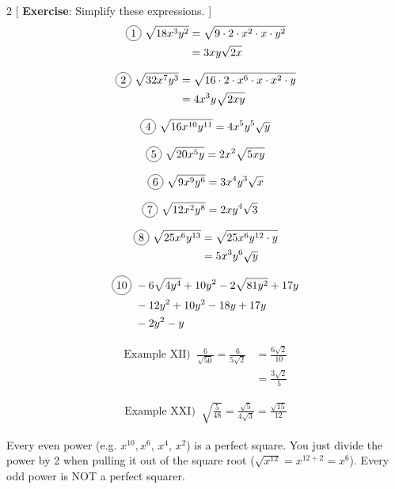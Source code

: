 \begin{multicols}{2}
[
  \textbf{Exercise}: Simplify these expressions.
]
\begin{align*}
  \circled{1}\ \sqrt{18x^{3}y^{2}}&= \sqrt{9 \cdot 2 \cdot x^{2} \cdot x \cdot y^{2}} \\
  &=3xy\sqrt{2x}
\end{align*}


\begin{align*}
  \circled{2}\ \sqrt{32x^{7}y^{3}}&=\sqrt{16\cdot 2 \cdot x^{6} \cdot x\cdot x^{2}\cdot y}\\
  &=4x^{3}y\sqrt{2xy}
\end{align*}

\begin{align*}
  \circled{4}\ \sqrt{16x^{10}y^{11}}=4x^{5}y^{5}\sqrt{y}
\end{align*}

\begin{align*}
  \circled{5}\ \sqrt{20x^{5}y}=2x^{2}\sqrt{5xy}
\end{align*}

\begin{align*}
  \circled{6}\ \sqrt{9x^{9}y^{6}}=3x^{4}y^{3}\sqrt{x}
\end{align*}

\begin{align*}
  \circled{7}\ \sqrt{12x^{2}y^{8}}&=2xy^{4}\sqrt{3}
\end{align*}

\begin{align*}
  \circled{8}\ \sqrt{25x^{6}y^{13}}&=\sqrt{25x^{6}y^{12}\cdot y}\\
  &=5x^{3}y^{6}\sqrt{y}
\end{align*}

\begin{align*}
  \circled{10}\ &-6\sqrt{4y^{4}}+10y^{2}-2\sqrt{81y^{2}}+17y\\
  &-12y^{2}+10y^{2}-18y+17y\\
  &-2y^{2}-y
\end{align*}

\begin{align*}
  \text{Example XII) }\ \frac{6}{\sqrt{50}}=\frac{6}{5\sqrt{2}}&=\frac{6\sqrt{2}}{10}\\
  &=\frac{3\sqrt{2}}{5}
\end{align*}

\begin{align*}
  \text{Example XXI) }\ \sqrt{\frac{5}{48}}=\frac{\sqrt{5}}{4\sqrt{3}}=\frac{\sqrt{15}}{12}
\end{align*}

\end{multicols}

Every even power (e.g. $x^{10}, $$x^{6}$, $x^{4}$, $x^{2}$) is a perfect square. You just divide the power by 2 when pulling it out of the square root ($\sqrt{x^{12}}=x^{12\div 2}=x^{6}$). Every odd power is NOT a perfect squarer.

